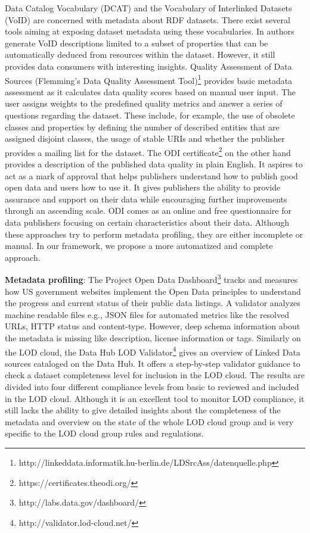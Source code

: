 \documentclass[runningheads,a4paper]{llncs}
\begin{document}
Data Catalog Vocabulary (DCAT) \cite{Erickson:14:DCV} and the Vocabulary of Interlinked Datasets (VoID) \cite{Cyganiak:11:DLD} are concerned with metadata about RDF datasets. There exist several tools aiming at exposing dataset metadata using these vocabularies. In \cite{BoHm:2011:CVD:2030805.2031001} authors generate VoID descriptions limited to a subset of properties that can be automatically deduced from resources within the dataset. However, it still provides data consumers with interesting insights. Quality Assessment of Data Sources (Flemming's Data Quality Assessment Tool)\footnote{http://linkeddata.informatik.hu-berlin.de/LDSrcAss/datenquelle.php} provides basic metadata assessment as it calculates data quality scores based on manual user input. The user assigns weights to the predefined quality metrics and answer a series of questions regarding the dataset. These include, for example, the use of obsolete classes and properties by defining the number of described entities that are assigned disjoint classes, the usage of stable URIs and whether the publisher provides a mailing list for the dataset. The ODI certificate\footnote {https://certificates.theodi.org/} on the other hand provides a description of the published data quality in plain English. It aspires to act as a mark of approval that helps publishers understand how to publish good open data and users how to use it. It gives publishers the ability to provide assurance and support on their data while encouraging further improvements through an ascending scale. ODI comes as an online and free questionnaire for data publishers focusing on certain characteristics about their data. Although these approaches try to perform metadata profiling, they are either incomplete or manual. In our framework, we propose a more automatized and complete approach.

\textbf{Metadata profiling}: The Project Open Data Dashboard\footnote{http://labs.data.gov/dashboard/} tracks and measures how US government websites implement the Open Data principles to understand the progress and current status of their public data listings. A validator analyzes machine readable files e.g., JSON files for automated metrics like the resolved URLs, HTTP status and content-type. However, deep schema information about the metadata is missing like description, license information or tags. Similarly on the LOD cloud, the Data Hub LOD Validator\footnote{http://validator.lod-cloud.net/} gives an overview of Linked Data sources cataloged on the Data Hub. It offers a step-by-step validator guidance to check a dataset completeness level for inclusion in the LOD cloud. The results are divided into four different compliance levels from basic to reviewed and included in the LOD cloud. Although it is an excellent tool to monitor LOD compliance, it still lacks the ability to give detailed insights about the completeness of the metadata and overview on the state of the whole LOD cloud group and is very specific to the LOD cloud group rules and regulations.
\end{document}
